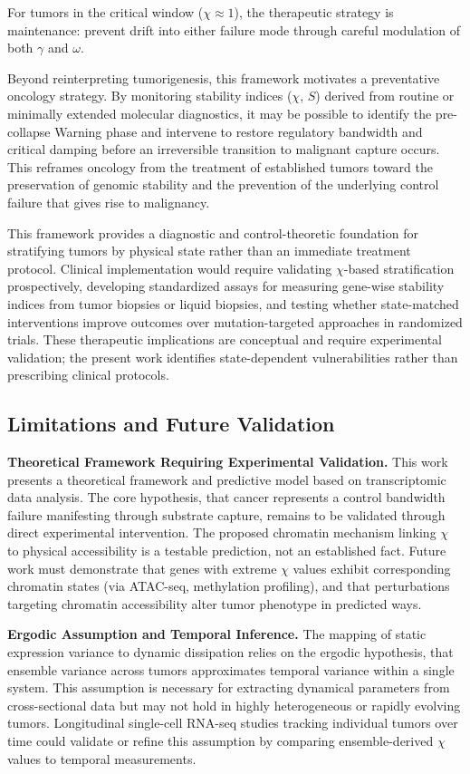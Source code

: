\documentclass[11pt,letterpaper]{article}
\begin{document}
For tumors in the critical window ($\chi \approx 1$), the therapeutic strategy is maintenance: prevent drift into either failure mode through careful modulation of both $\gamma$ and $\omega$.

Beyond reinterpreting tumorigenesis, this framework motivates a preventative oncology strategy. By monitoring stability indices ($\chi$, $S$) derived from routine or minimally extended molecular diagnostics, it may be possible to identify the pre-collapse Warning phase and intervene to restore regulatory bandwidth and critical damping before an irreversible transition to malignant capture occurs. This reframes oncology from the treatment of established tumors toward the preservation of genomic stability and the prevention of the underlying control failure that gives rise to malignancy.

This framework provides a diagnostic and control-theoretic foundation for stratifying tumors by physical state rather than an immediate treatment protocol. Clinical implementation would require validating $\chi$-based stratification prospectively, developing standardized assays for measuring gene-wise stability indices from tumor biopsies or liquid biopsies, and testing whether state-matched interventions improve outcomes over mutation-targeted approaches in randomized trials. These therapeutic implications are conceptual and require experimental validation; the present work identifies state-dependent vulnerabilities rather than prescribing clinical protocols.

\subsection{Limitations and Future Validation}

\textbf{Theoretical Framework Requiring Experimental Validation.} This work presents a theoretical framework and predictive model based on transcriptomic data analysis. The core hypothesis, that cancer represents a control bandwidth failure manifesting through substrate capture, remains to be validated through direct experimental intervention. The proposed chromatin mechanism linking $\chi$ to physical accessibility is a testable prediction, not an established fact. Future work must demonstrate that genes with extreme $\chi$ values exhibit corresponding chromatin states (via ATAC-seq, methylation profiling), and that perturbations targeting chromatin accessibility alter tumor phenotype in predicted ways.

\textbf{Ergodic Assumption and Temporal Inference.} The mapping of static expression variance to dynamic dissipation relies on the ergodic hypothesis, that ensemble variance across tumors approximates temporal variance within a single system. This assumption is necessary for extracting dynamical parameters from cross-sectional data but may not hold in highly heterogeneous or rapidly evolving tumors. Longitudinal single-cell RNA-seq studies tracking individual tumors over time could validate or refine this assumption by comparing ensemble-derived $\chi$ values to temporal measurements.
\end{document}
